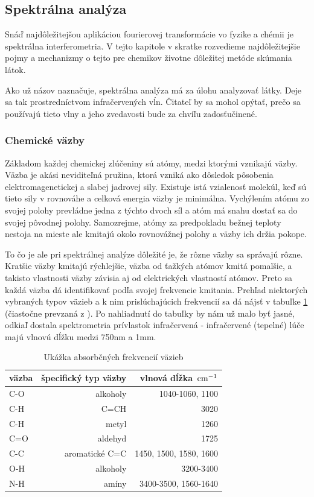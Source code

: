 \subsection{Spektrálna analýza}

Snáď najdôležitejšou aplikáciou fourierovej transformácie vo fyzike a
chémii je spektrálna interferometria. V tejto kapitole v skratke
rozvedieme najdôležitejšie pojmy a mechanizmy o tejto pre chemikov
životne dôležitej metóde skúmania látok.


Ako už názov naznačuje, spektrálna analýza má za úlohu analyzovať
látky. Deje sa tak prostredníctvom infračervených vĺn. Čitateľ by sa
mohol opýtať, prečo sa používajú tieto vlny a jeho zvedavosti bude za
chvíľu zadosťučinené.

\subsubsection{Chemické väzby}

Základom každej chemickej zlúčeniny sú atómy, medzi ktorými vznikajú
väzby. Väzba je akási neviditeľná pružina, ktorá vzniká ako dôsledok
pôsobenia elektromagenetickej a slabej jadrovej sily. Existuje istá
vzialenosť molekúl, keď sú tieto sily v rovnováhe a celková energia
väzby je minimálna. Vychýlením atómu zo svojej polohy prevládne jedna
z týchto dvoch síl a atóm má snahu dostať sa do svojej pôvodnej
polohy. Samozrejme, atómy za predpokladu bežnej teploty nestoja na
mieste ale kmitajú okolo rovnovážnej polohy a väzby ich držia pokope.

To čo je ale pri spektrálnej analýze dôležité je, že rôzne väzby sa
správajú rôzne. Kratšie väzby kmitajú rýchlejšie, väzba od ťažkých
atómov kmitá pomalšie, a takisto vlastnosti väzby závisia aj od
elektrických vlastností atómov. Preto sa každá väzba dá identifikovať
podľa svojej frekvencie kmitania. Prehľad niektorých vybraných typov
väzieb a k nim prislúchajúcich frekvencií sa dá nájsť v tabuľke 
\ref{tab:vazby} (čiastočne prevzaná z \cite{wiki:spectro}).
Po nahliadnutí do tabuľky by nám už malo byť jasné, odkiaľ dostala
spektrometria prívlastok infračervená - infračervené (tepelné) lúče
majú vlnovú dĺžku medzi 750nm a 1mm.

\begin{table}[htb]
    \centering
    \begin{tabular}{| l | r | r |}
        \hline
        väzba & špecifický typ väzby & vlnová dĺžka $\,\mbox{cm}^{-1}$ \\ \hline
        C-O & alkoholy & 1040-1060, 1100 \\ \hline
        C-H & C=CH & 3020 \\ \hline
        C-H & metyl & 1260 \\ \hline
        C=O & aldehyd & 1725 \\ \hline
        C-C & aromatické C=C & 1450, 1500, 1580, 1600 \\ \hline
        O-H & alkoholy & 3200-3400 \\ \hline
        N-H & amíny & 3400-3500, 1560-1640 \\ \hline
    \end{tabular}
    \caption{Ukážka absorbčných frekvencií väzieb}\label{tab:vazby}
\end{table}

